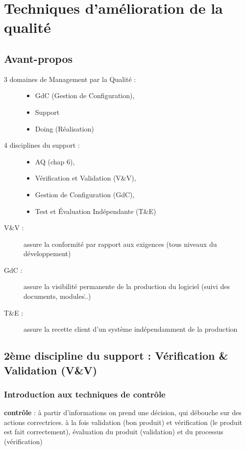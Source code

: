 \chapter{Techniques d’amélioration de la qualité}

\section{Avant-propos}

\begin{description}
	\item[3 domaines de Management par la Qualité :]
	\begin{itemize}
		\item GdC (Gestion de Configuration),
		\item Support
		\item Doing (Réalisation)
	\end{itemize}

	\item[4 disciplines du support :]
	\begin{itemize}
		\item AQ (chap 6),
		\item Vérification et Validation (V\&V),
		\item Gestion de Configuration (GdC),
		\item Test et Évaluation Indépendante (T\&E)\\
	\end{itemize}
	\item[V\&V :] assure la conformité par rapport aux exigences (tous niveaux du développement)
	\item[GdC :] assure la visibilité permanente de la production du logiciel (suivi des documents, modules\...)
	\item[T\&E :] assure la recette client d’un système indépendamment de la production
\end{description}

\section{2ème discipline du support : Vérification \& Validation (V\&V)}

	\subsection{Introduction aux techniques de contrôle}

\textbf{contrôle} : à partir d’informations on prend une décision, qui débouche sur des actions correctrices. à la fois validation (bon produit) et vérification (le produit est fait correctement), évaluation du produit (validation) et du processus (vérification)\\\hfill\\

